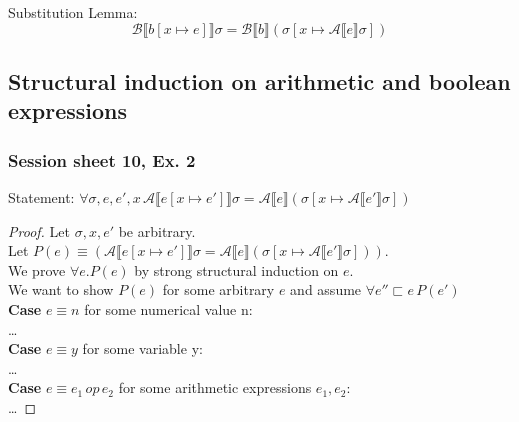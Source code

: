 \documentclass[11.5pt]{article}
\def\A{\mathcal{A}}
\def\B{\mathcal{B}}
\def\llb{\llbracket}
\def\rrb{\rrbracket}
\begin{document}
Substitution Lemma:
$$ \B \llb b [x \mapsto e]\rrb \sigma = \B \llb b\rrb (\sigma[x \mapsto \A \llb e \rrb \sigma])$$

\subsection{Structural induction on arithmetic and boolean expressions}
\subsubsection{Session sheet 10, Ex. 2}
Statement: $ \forall \sigma, e, e', x \, \A \llb e [x \mapsto e']\rrb \sigma = \A \llb e \rrb (\sigma[x \mapsto \A \llb e' \rrb \sigma])$
\begin{proof}
    Let $\sigma, x, e'$ be arbitrary. \\
    Let $P(e) \equiv (\A \llb e [x \mapsto e']\rrb \sigma = \A \llb e \rrb (\sigma[x \mapsto \A \llb e' \rrb \sigma]))$.\\
    We prove $\forall e. P(e)$ by strong structural induction on $e$. \\
    We want to show $P(e)$ for some arbitrary $e$ and assume $\forall e''  \sqsubset e \, P(e')$ \\
    \textbf{Case} $e \equiv n$ for some numerical value n:\\
    \dots \\
    \textbf{Case} $e \equiv y$ for some variable y:\\
    \dots \\
    \textbf{Case} $e \equiv e_1 \, op \, e_2$ for some arithmetic expressions $e_1, e_2$:\\
    \dots 
\end{proof}
\end{document}
